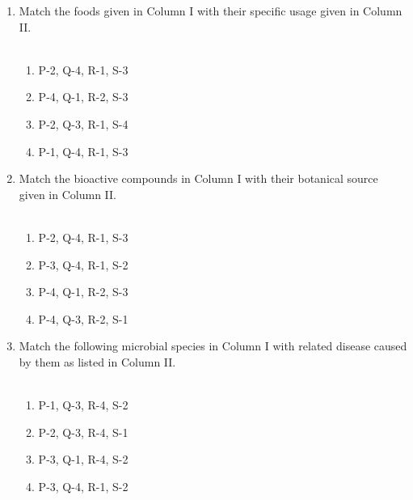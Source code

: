 \documentclass[journal,12pt,onecolumn]{IEEEtran}
\begin{document}
\begin{enumerate}[label=\arabic*)]
\vspace{0.5cm}

\item Match the foods given in Column I with their specific usage given in Column II.\\



\hfill{} \\

\vspace{0.2cm}
\begin{enumerate}[label=\alph*)]
\item P-2, Q-4, R-1, S-3
\item P-4, Q-1, R-2, S-3
\item P-2, Q-3, R-1, S-4
\item P-1, Q-4, R-1, S-3
\end{enumerate}

\vspace{0.5cm}

\item Match the bioactive compounds in Column I with their botanical source given in Column II.\\



\hfill{} \\

\vspace{0.2cm}
\begin{enumerate}[label=\alph*)]
\item P-2, Q-4, R-1, S-3
\item P-3, Q-4, R-1, S-2
\item P-4, Q-1, R-2, S-3
\item P-4, Q-3, R-2, S-1
\end{enumerate}

\vspace{0.5cm}

\item Match the following microbial species in Column I with related disease caused by them as listed in Column II.\\



\hfill{} \\

\vspace{0.2cm}
\begin{enumerate}[label=\alph*)]
\item P-1, Q-3, R-4, S-2
\item P-2, Q-3, R-4, S-1
\item P-3, Q-1, R-4, S-2
\item P-3, Q-4, R-1, S-2
\end{enumerate}


\end{enumerate}
\end{document}

